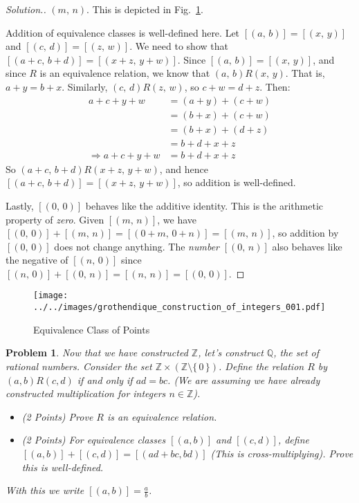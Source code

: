 \documentclass{article}
\theoremstyle{normal}
\newtheorem{problem}{Problem}
\begin{document}
\begin{proof}[Solution.]
        $(m,\,n)$. This is depicted in
        Fig.~\ref{fig:grothendique_construction_of_integers_001}.
        \par\hfill\par
        Addition of equivalence classes is well-defined here. Let
        $[(a,\,b)]=[(x,\,y)]$ and $[(c,\,d)]=[(z,\,w)]$. We need to show
        that $[(a+c,\,b+d)]=[(x+z,\,y+w)]$. Since $[(a,\,b)]=[(x,\,y)]$, and
        since $R$ is an equivalence relation, we know that
        $(a,\,b)R(x,\,y)$. That is, $a+y=b+x$. Similarly, $(c,\,d)R(z,\,w)$, so
        $c+w=d+z$. Then:
        \begin{align}
            a+c+y+w
            &=(a+y)+(c+w)\tag{Associativity and Commutativity}\\
            &=(b+x)+(c+w)\tag{Substitution}\\
            &=(b+x)+(d+z)\tag{Substitution}\\
            &=b+d+x+z\tag{Associativity and Commutativity}\\
            \Rightarrow
            a+c+y+w
            &=b+d+x+z\tag{Transitivity of Equality}
        \end{align}
        So $(a+c,\,b+d)R(x+z,\,y+w)$, and hence
        $[(a+c,\,b+d)]=[(x+z,\,y+w)]$, so addition is well-defined.
        \par\hfill\par
        Lastly, $[(0,\,0)]$ behaves like the additive identity. This is the
        arithmetic property of \textit{zero}. Given $[(m,\,n)]$, we have
        $[(0,\,0)]+[(m,\,n)]=[(0+m,\,0+n)]=[(m,\,n)]$, so addition by
        $[(0,\,0)]$ does not change anything. The \textit{number}
        $[(0,\,n)]$ also behaves like the negative of $[(n,\,0)]$ since
        $[(n,\,0)]+[(0,\,n)]=[(n,\,n)]=[(0,\,0)]$.
    \end{proof}
    \begin{figure}
        \centering
        \texttt{[image: ../../images/grothendique\_construction\_of\_integers\_001.pdf]}
        \caption{Equivalence Class of Points}
        \label{fig:grothendique_construction_of_integers_001}
    \end{figure}
    \clearpage
    \color{blue}
    \begin{problem}
        Now that we have constructed $\mathbb{Z}$, let's construct $\mathbb{Q}$,
        the set of rational numbers. Consider the set
        $\mathbb{Z}\times(\mathbb{Z}\setminus\{\,0\,\})$. Define the relation
        $R$ by $(a,b)R(c,d)$ if and only if $ad=bc$. (We are assuming we have
        already constructed multiplication for integers $n\in\mathbb{Z}$).
        \begin{itemize}
            \item (2 Points) Prove $R$ is an equivalence relation.
            \item (2 Points) For equivalence classes $[(a,b)]$ and $[(c,d)]$,
                define $[(a,b)]+[(c,d)]=[(ad+bc,bd)]$ (This is
                \textit{cross-multiplying}). Prove this is well-defined.
        \end{itemize}
        With this we write $[(a,b)]=\frac{a}{b}$.
    \end{problem}
\end{document}
